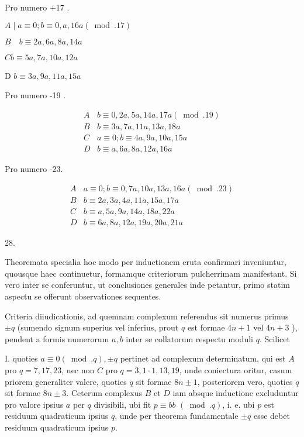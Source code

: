 \documentclass[10pt]{article}
\begin{document}
Pro numero +17 .

\(A \mid a \equiv 0 ; b \equiv 0, a, 16 a(\bmod .17)\)

\(B \quad b \equiv 2 a, 6 a, 8 a, 14 a\)

\(C b \equiv 5 a, 7 a, 10 a, 12 a\)

D \(b \equiv 3 a, 9 a, 11 a, 15 a\)

Pro numero -19 .

\[
\begin{array}{c|l}
A & b \equiv 0,2 a, 5 a, 14 a, 17 a(\bmod .19) \\
B & b \equiv 3 a, 7 a, 11 a, 13 a, 18 a \\
C & a \equiv 0 ; b \equiv 4 a, 9 a, 10 a, 15 a \\
D & b \equiv a, 6 a, 8 a, 12 a, 16 a
\end{array}
\]

Pro numero -23.

\[
\begin{array}{l|l}
A & a \equiv 0 ; b \equiv 0,7 a, 10 a, 13 a, 16 a(\bmod .23) \\
B & b \equiv 2 a, 3 a, 4 a, 11 a, 15 a, 17 a \\
C & b \equiv a, 5 a, 9 a, 14 a, 18 a, 22 a \\
D & b \equiv 6 a, 8 a, 12 a, 19 a, 20 a, 21 a
\end{array}
\]

28.

Theoremata specialia hoc modo per inductionem eruta confirmari inveniuntur, quousque haec continuetur, formamque criteriorum pulcherrimam manifestant. Si vero inter se conferuntur, ut conclusiones generales inde petantur, primo statim aspectu se offerunt observationes sequentes.

Criteria diiudicationis, ad quemnam complexum referendus sit numerus primus \(\pm q\) (sumendo signum superius vel inferius, prout \(q\) est formae \(4 n+1\) vel \(4 n+3\) ), pendent a formis numerorum \(a, b\) inter se collatorum respectu moduli \(q\). Scilicet

I. quoties \(a \equiv 0(\bmod . q), \pm q\) pertinet ad complexum determinatum, qui est \(A\) pro \(q=7,17,23\), nec non \(C\) pro \(q=3,1 \cdot 1,13,19\), unde coniectura oritur, casum priorem generaliter valere, quoties \(q\) sit formae \(8 n \pm 1\), posteriorem vero, quoties \(q\) sit formae \(8 n \pm 3\). Ceterum complexus \(B\) et \(D\) iam absque inductione excluduntur pro valore ipsius \(a\) per \(q\) divisibili, ubi fit \(p \equiv b b\) \((\bmod . q)\), i. e. ubi \(p\) est residuum quadraticum ipsius \(q\), unde per theorema fundamentale \(\pm q\) esse debet residuum quadraticum ipsius \(p\).
\end{document}
